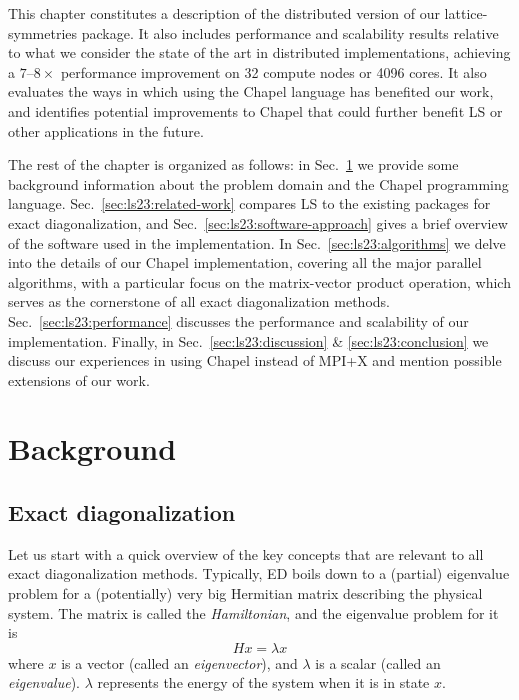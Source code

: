 This chapter constitutes a description of the distributed version of our lattice-symmetries package. It also includes performance and scalability results relative to what we consider the state of the art in distributed implementations, achieving a $7$--$8\times$ performance improvement on 32 compute nodes or 4096 cores. It also evaluates the ways in which using the Chapel language has benefited our work, and identifies potential improvements to Chapel that could further benefit LS or other applications in the future.

The rest of the chapter is organized as follows: in Sec.~\ref{sec:ls23:background} we provide some background information about the problem domain and the Chapel programming language. Sec.~\ref{sec:ls23:related-work} compares LS to the existing packages for exact diagonalization, and Sec.~\ref{sec:ls23:software-approach} gives a brief overview of the software used in the implementation. In Sec.~\ref{sec:ls23:algorithms} we delve into the details of our Chapel implementation, covering all the major parallel algorithms, with a particular focus on the matrix-vector product operation, which serves as the cornerstone of all exact diagonalization methods. Sec.~\ref{sec:ls23:performance} discusses the performance and scalability of our implementation. Finally, in Sec.~\ref{sec:ls23:discussion} \& \ref{sec:ls23:conclusion} we discuss our experiences in using Chapel instead of MPI+X and mention possible extensions of our work.

\section{Background}\label{sec:ls23:background}

\subsection{Exact diagonalization}

Let us start with a quick overview of the key concepts that are relevant to all exact diagonalization methods. Typically, ED boils down to a (partial) eigenvalue problem for a (potentially) very big Hermitian matrix describing the physical system. The matrix is called the \emph{Hamiltonian}, and the eigenvalue problem for it is
\begin{equation*}
  H x = \lambda x
\end{equation*}
where $x$ is a vector (called an \emph{eigenvector}), and $\lambda$ is a scalar (called an \emph{eigenvalue}). $\lambda$ represents the energy of the system when it is in state $x$.
 
